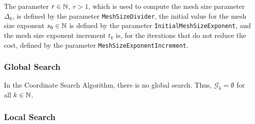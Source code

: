 The parameter $r \in {\mathbb N}$, $r>1$, which is used to compute the mesh size parameter
$\Delta_k$,
is defined by the parameter \texttt{MeshSizeDivider},
the initial value for the mesh size exponent $s_0 \in {\mathbb N}$
is defined by the parameter \texttt{InitialMeshSizeExponent},
and the mesh size exponent increment $t_k$ is, for the
iterations that do not reduce the cost,
defined by the parameter \texttt{MeshSizeExponentIncrement}.

\subsubsection{Global Search}

In the Coordinate Search Algorithm, there is no global search.
Thus, $\mathcal G_k = \emptyset$ for all $k \in {\mathbb N}$.

\subsubsection{Local Search}

